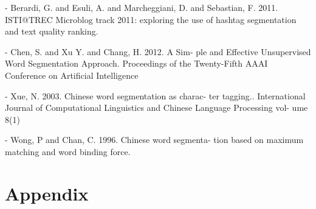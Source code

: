 \documentclass[12pt]{comjnl}
\begin{document}
- Berardi, G. and Esuli, A. and Marcheggiani, D. and
Sebastian, F. 2011. ISTI@TREC Microblog track
2011: exploring the use of hashtag segmentation
and text quality ranking.

- Chen, S. and Xu Y. and Chang, H. 2012. A Sim-
ple and Effective Unsupervised Word Segmentation
Approach. Proceedings of the Twenty-Fifth AAAI
Conference on Artificial Intelligence

- Xue, N. 2003. Chinese word segmentation as charac-
ter tagging.. International Journal of Computational
Linguistics and Chinese Language Processing vol-
ume 8(1)

- Wong, P and Chan, C. 1996. Chinese word segmenta-
tion based on maximum matching and word binding
force.
\nocite{*}




\section{Appendix}
\end{document}
